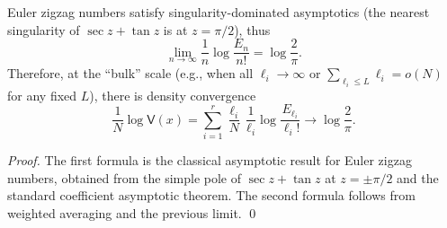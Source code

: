 

\begin{theorem}\label{thm:pom-fence-volume-log2pi}
Euler zigzag numbers satisfy singularity-dominated asymptotics (the nearest singularity of \(\sec z+\tan z\) is at \(z=\pi/2\)), thus
\[
\lim_{n\to\infty}\frac{1}{n}\log\frac{E_n}{n!}=\log\frac{2}{\pi}.
\]
Therefore, at the ``bulk'' scale (e.g., when all \(\ell_i\to\infty\) or \(\sum_{\ell_i\le L}\ell_i=o(N)\) for any fixed \(L\)), there is density convergence
\[
\frac{1}{N}\log\mathsf V(x)
=\sum_{i=1}^r \frac{\ell_i}{N}\,\frac{1}{\ell_i}\log\frac{E_{\ell_i}}{\ell_i!}
\longrightarrow
\log\frac{2}{\pi}.
\]
\end{theorem}
\begin{proof}
The first formula is the classical asymptotic result for Euler zigzag numbers, obtained from the simple pole of \(\sec z+\tan z\) at \(z=\pm\pi/2\) and the standard coefficient asymptotic theorem.
The second formula follows from weighted averaging and the previous limit. \qed
\end{proof}

